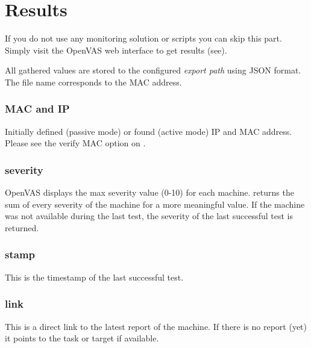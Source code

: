 \breakpoint\section{Results}

\hint If you do not use any monitoring solution or scripts you can skip this part. Simply visit the OpenVAS web interface to get results (see).

All gathered values are stored to the configured \emph{export path} using JSON format. The file name corresponds to the MAC address.


\breakpoint\subsubsection*{MAC and IP}
Initially defined (passive mode) or found (active mode) IP and MAC address.
Please see the verify MAC option on .

\breakpoint\subsubsection*{severity}
OpenVAS displays the max severity value (0-10) for each machine. \sw returns the sum of every severity of the machine for a more meaningful value.
If the machine was not available during the last test, the severity of the last successful test is returned.

\breakpoint\subsubsection*{stamp}
This is the timestamp of the last successful test.

\breakpoint\subsubsection*{link}\label{sec:link}
This is a direct link to the latest report of the machine. If there is no report (yet) it points to the task or target if available.
